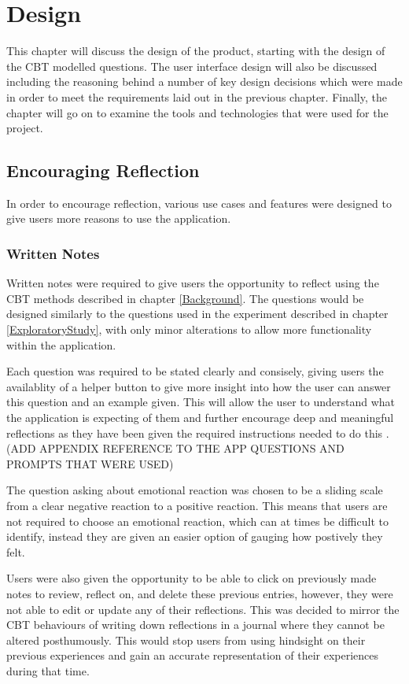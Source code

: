 \documentclass{l4proj}
\begin{document}
\chapter{Design}

This chapter will discuss the design of the product, starting with the design of the CBT modelled questions. The user interface design will also be discussed including the reasoning behind a number of key design decisions which were made in order to meet the requirements laid out in the previous chapter. Finally, the chapter will go on to examine the tools and technologies that were used for the project. 

\section{Encouraging Reflection}

In order to encourage reflection, various use cases and features were designed to give users more reasons to use the application.

\subsection{Written Notes}

Written notes were required to give users the opportunity to reflect using the CBT methods described in chapter \ref{Background}. The questions would be designed similarly to the questions used in the experiment described in chapter \ref{ExploratoryStudy}, with only minor alterations to allow more functionality within the application. 

Each question was required to be stated clearly and consisely, giving users the availablity of a helper button to give more insight into how the user can answer this question and an example given. This will allow the user to understand what the application is expecting of them and further encourage deep and meaningful reflections as they have been given the required instructions needed to do this \citep{bruno_reflective_2018}. (ADD APPENDIX REFERENCE TO THE APP QUESTIONS AND PROMPTS THAT WERE USED)

The question asking about emotional reaction was chosen to be a sliding scale from a clear negative reaction to a positive reaction. This means that users are not required to choose an emotional reaction, which can at times be difficult to identify, instead they are given an easier option of gauging how postively they felt. 

Users were also given the opportunity to be able to click on previously made notes to review, reflect on, and delete these previous entries, however, they were not able to edit or update any of their reflections. This was decided to mirror the CBT behaviours of writing down reflections in a journal where they cannot be altered posthumously. This would stop users from using hindsight on their previous experiences and gain an accurate representation of their experiences during that time. 
\end{document}
